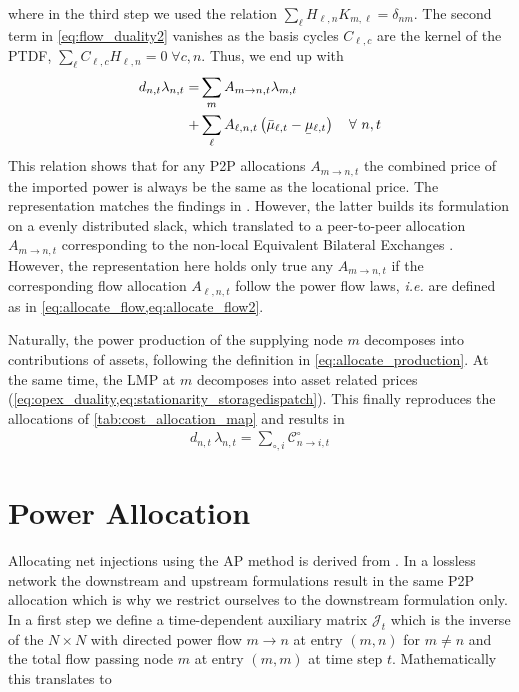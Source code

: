 \documentclass[11pt,twocolumn]{article}
\newcommand{\ie}{\textit{i.e.} }
\newcommand{\ubar}[1]{\underaccent{\bar}{#1}}
\newcommand{\Forall}[1]{\hspace{10pt} \forall \,\, #1 }
\newcommand{\mulowerflow}{\ubar{\mu}_{\ell,t}}
\newcommand{\muupperflow}{\bar{\mu}_{\ell,t}}
\newcommand{\lmp}[1][n]{\lambda_{#1,t}}
\newcommand{\demand}[1][n]{d_{#1,t}}
\newcommand{\incidence}[1][n]{K_{#1,\ell}}
\newcommand{\ptdf}[1][n]{H_{\ell,#1}}
\newcommand{\cycle}{C_{\ell,c}}
\newcommand{\cost}[1][\circ]{\mathcal{C}^{#1}}
\newcommand{\allocatepeer}[1][m \rightarrow n]{A_{#1,t}}
\newcommand{\allocateflow}[1][n]{A_{\ell,#1,t}}
\newcommand{\allocatecost}[1][n \rightarrow i]{\cost_{#1, t}}
\begin{document}
where in the third step we used the relation $\sum_\ell \ptdf \incidence[m] = \delta_{n m}$.
The second term in \cref{eq:flow_duality2} vanishes as the basis cycles $\cycle$ are the kernel of the PTDF, $\sum_{\ell} \cycle \ptdf  = 0 \; \forall c,n$. Thus, we end up with 
\begin{align}
    \notag
    \demand \lmp =& \sum_{m} \allocatepeer \lmp[m] \\
    +& \sum_\ell \allocateflow \left(\muupperflow - \mulowerflow\right) \Forall{n,t}
\end{align}
This relation shows that for any P2P allocations $\allocatepeer$ the combined price of the imported power is always be the same as the locational price. The representation matches the findings in \cite{wu_locational_2005}. However, the latter builds its formulation on a evenly distributed slack, which translated to a peer-to-peer allocation $\allocatepeer$ corresponding to the non-local Equivalent Bilateral Exchanges \cite{galiana_transmission_2003}. However, the representation here holds only true any $\allocatepeer$ if the corresponding flow allocation $\allocateflow$ follow the power flow laws, \ie are defined as in \cref{eq:allocate_flow,eq:allocate_flow2}. 

Naturally, the power production of the supplying node $m$ decomposes into contributions of assets, following the definition in \cref{eq:allocate_production}. At the same time, the LMP at $m$ decomposes into asset related prices (\cref{eq:opex_duality,eq:stationarity_storagedispatch}). This finally reproduces the allocations of \cref{tab:cost_allocation_map} and results in 
\begin{align}
    \demand \, \lmp =  \sum_{\circ, i} \allocatecost 
\end{align}


\section{Power Allocation}
\label{sec:net_ap}

\newcommand{\incidenceM}{K}
\newcommand{\flowM}{f}
\newcommand{\injectionM}{p}
\newcommand{\slackM}{k}
\newcommand{\DirectedIncidence}{\mathcal{K}}
\newcommand{\InverseAPInjection}{\mathcal{J}}
\newcommand\diag[1]{\operatorname{diag}\left(#1\right)}


Allocating net injections using the AP method is derived from \cite{achayuthakan_electricity_2010}. In a lossless network the downstream and upstream formulations result in the same P2P allocation which is why we restrict ourselves to the downstream formulation only. In a first step we define a time-dependent auxiliary matrix $\InverseAPInjection_t$ which is the inverse of the $N\times N$ with directed power flow $m \rightarrow n$ at entry $(m, n)$ for $m \ne n$ and the total flow passing node $m$ at entry $\left( m, m\right)$ at time step $t$. Mathematically this translates to
\end{document}
